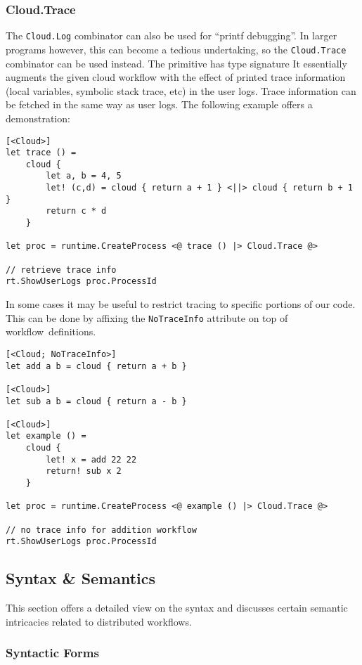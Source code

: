 \subsubsection*{Cloud.Trace}
The \texttt{Cloud.Log} combinator can also be used for ``printf debugging''. 
In larger programs however, this can become a tedious undertaking, 
so the \texttt{Cloud.Trace} combinator can be used instead. 
The primitive has type signature
It essentially augments the given cloud workflow with the effect of printed trace information
(local variables, symbolic stack trace, etc)
in the user logs. Trace information can be fetched in the same way as user logs. 
The following example offers a demonstration:
\begin{lstlisting}
[<Cloud>]
let trace () =
    cloud {
        let a, b = 4, 5
        let! (c,d) = cloud { return a + 1 } <||> cloud { return b + 1 }
        return c * d
    }
    
let proc = runtime.CreateProcess <@ trace () |> Cloud.Trace @>

// retrieve trace info
rt.ShowUserLogs proc.ProcessId
\end{lstlisting}
In some cases it may be useful to restrict tracing to specific portions of our code. 
This can be done by affixing the \texttt{NoTraceInfo} attribute on top of workflow\
definitions.
\begin{lstlisting}
[<Cloud; NoTraceInfo>]
let add a b = cloud { return a + b }
 
[<Cloud>]
let sub a b = cloud { return a - b }
 
[<Cloud>]
let example () =
    cloud {
        let! x = add 22 22
        return! sub x 2
    }
    
let proc = runtime.CreateProcess <@ example () |> Cloud.Trace @>

// no trace info for addition workflow
rt.ShowUserLogs proc.ProcessId
\end{lstlisting}

\subsection{Syntax \& Semantics}

This section offers a detailed view on the syntax and discusses certain semantic 
intricacies related to distributed workflows.

\subsubsection*{Syntactic Forms}

